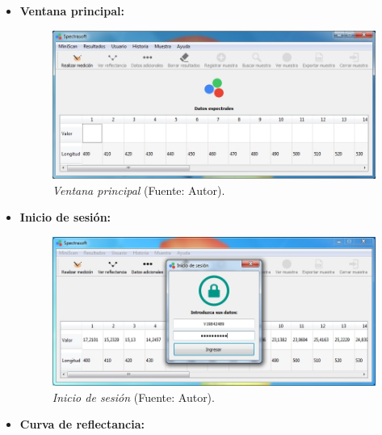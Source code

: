  \begin{itemize}
 	
 	\item \textbf{Ventana principal:}
 	
 		\begin{figure}[H]
		\centering
		\includegraphics[scale=0.6]{img/vista-principal.jpg}
			\caption[Ventana principal]{\textit{Ventana principal} (Fuente: Autor).}
	\end{figure}
	
	 	\item \textbf{Inicio de sesi\'{o}n:}
 	
 		\begin{figure}[H]
		\centering
		\includegraphics[scale=0.6]{img/vista-inicio-sesion.jpg}
			\caption[Inicio de sesi\'{o}n]{\textit{Inicio de sesi\'{o}n} (Fuente: Autor).}
	\end{figure}

\newpage
	 	\item \textbf{Curva de reflectancia:}
 	

\end{itemize}
